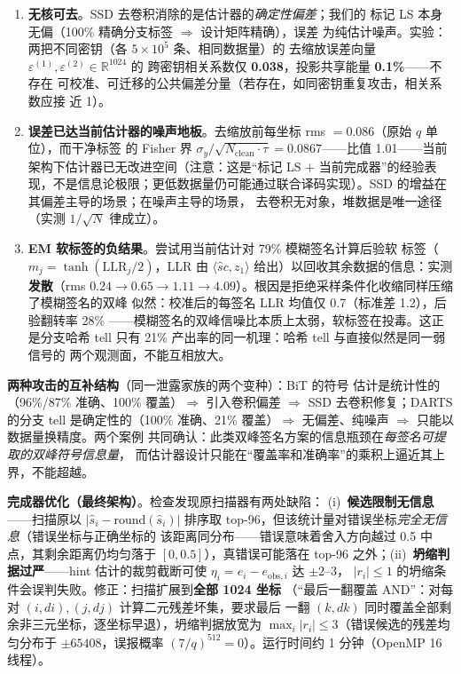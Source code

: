 \documentclass[UTF8,11pt,a4paper]{ctexart}
\begin{document}
\begin{enumerate}
\item \textbf{无核可去}。SSD 去卷积消除的是估计器的\emph{确定性偏差}；我们的
      标记 LS 本身无偏（100\% 精确分支标签 $\Rightarrow$ 设计矩阵精确），误差
      为纯估计噪声。实验：两把不同密钥（各 $5\times10^5$ 条、相同数据量）的
      去缩放误差向量 $\varepsilon^{(1)},\varepsilon^{(2)}\in\mathbb R^{1024}$ 的
      跨密钥相关系数仅 \textbf{0.038}，投影共享能量 \textbf{0.1\%}——不存在
      可校准、可迁移的公共偏差分量（若存在，如同密钥重复攻击，相关系数应接
      近 1）。
\item \textbf{误差已达当前估计器的噪声地板}。去缩放前每坐标 rms $=0.086$（原始 $q$ 单位），而干净标签
      的 Fisher 界 $\sigma_y/\sqrt{N_{\mathrm{clean}}\cdot\tau}=0.0867$——比值
      1.01——当前架构下估计器已无改进空间（注意：这是``标记 LS $+$ 当前完成器''的经验表现，不是信息论极限；更低数据量仍可能通过联合译码实现）。SSD 的增益在其偏差主导的场景；在噪声主导的场景，
      去卷积无对象，堆数据是唯一途径（实测 $1/\sqrt{N}$ 律成立）。
\item \textbf{EM 软标签的负结果}。尝试用当前估计对 79\% 模糊签名计算后验软
      标签（$m_j=\tanh(\mathrm{LLR}_j/2)$，LLR 由 $\langle \hat s c,z_1\rangle$
      给出）以回收其余数据的信息：实测 \textbf{发散}（rms $0.24\to0.65\to
      1.11\to4.09$）。根因是拒绝采样条件化收缩同样压缩了模糊签名的双峰
      似然：校准后的每签名 LLR 均值仅 0.7（标准差 1.2），后验翻转率 28\%
      ——模糊签名的双峰信噪比本质上太弱，软标签在投毒。这正是分支哈希
      tell 只有 21\% 产出率的同一机理：哈希 tell 与直接似然是同一弱信号的
      两个观测面，不能互相放大。
\end{enumerate}

\noindent \textbf{两种攻击的互补结构}（同一泄露家族的两个变种）：BiT 的符号
估计是统计性的（96\%/87\% 准确、100\% 覆盖）$\Rightarrow$ 引入卷积偏差
$\Rightarrow$ SSD 去卷积修复；DARTS 的分支 tell 是确定性的（100\% 准确、21\%
覆盖）$\Rightarrow$ 无偏差、纯噪声 $\Rightarrow$ 只能以数据量换精度。两个案例
共同确认：此类双峰签名方案的信息瓶颈在\emph{每签名可提取的双峰符号信息量}，
而估计器设计只能在``覆盖率和准确率''的乘积上逼近其上界，不能超越。

\noindent \textbf{完成器优化（最终架构）}。检查发现原扫描器有两处缺陷：
(i)~\textbf{候选限制无信息}——扫描原以 $|\hat s_i - \mathrm{round}(\hat s_i)|$
排序取 top-96，但该统计量对错误坐标\emph{完全无信息}（错误坐标与正确坐标的
该距离同分布——错误意味着舍入方向越过 0.5 中点，其剩余距离仍均匀落于
$[0,0.5]$），真错误可能落在 top-96 之外；(ii)~\textbf{坍缩判据过严}——hint
估计的裁剪截断可使 $\eta_i = e_i - e_{\mathrm{obs},i}$ 达 $\pm 2$--$3$，
$|r_i|\le 1$ 的坍缩条件会误判失败。修正：扫描扩展到\textbf{全部 1024 坐标}
（``最后一翻覆盖 AND''：对每对 $(i,di),(j,dj)$ 计算二元残差坏集，要求最后
一翻 $(k,dk)$ 同时覆盖全部剩余非三元坐标，逐坐标早退），坍缩判据放宽为
$\max_i |r_i| \le 3$（错误候选的残差均匀分布于 $\pm 65408$，误报概率
$(7/q)^{512}=0$）。运行时间约 1 分钟（OpenMP 16 线程）。
\end{document}
